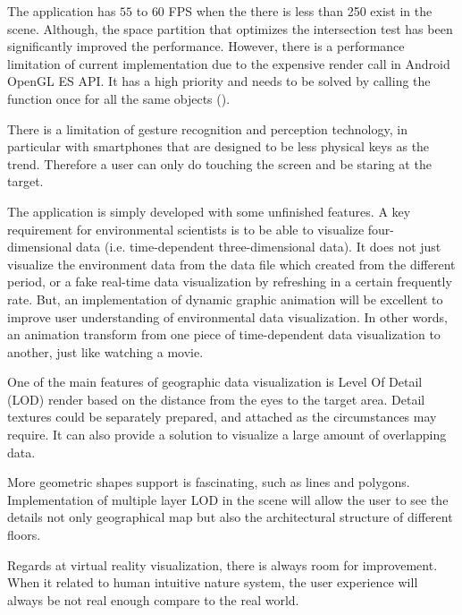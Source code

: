 The application has $55$ to $60$ FPS when the there is less than 250  exist in the scene. Although, the space partition that optimizes the intersection test has been significantly improved the performance. However, there is a performance limitation of current implementation due to the expensive render call in Android OpenGL ES API. It has a high priority and needs to be solved by calling the function once for all the same objects ().

There is a limitation of gesture recognition and perception technology, in particular with smartphones that are designed to be less physical keys as the trend. Therefore a user can only do touching the screen and be staring at the target.

The application is simply developed with some unfinished features. A key requirement for environmental scientists is to be able to visualize four-dimensional data (i.e. time-dependent three-dimensional data). It does not just visualize the environment data from the data file which created from the different period, or a fake real-time data visualization by refreshing in a certain frequently rate. But, an implementation of dynamic graphic animation will be excellent to improve user understanding of environmental data visualization. In other words, an animation transform from one piece of time-dependent data visualization to another, just like watching a movie.

One of the main features of geographic data visualization is Level Of Detail (LOD) render based on the distance from the eyes to the target area. Detail textures could be separately prepared, and attached as the circumstances may require. It can also provide a solution to visualize a large amount of overlapping data.

More geometric shapes support is fascinating, such as lines and polygons. Implementation of multiple layer LOD in the scene will allow the user to see the details not only geographical map but also the architectural structure of different floors.

Regards at virtual reality visualization, there is always room for improvement. When it related to human intuitive nature system, the user experience will always be not real enough compare to the real world.

